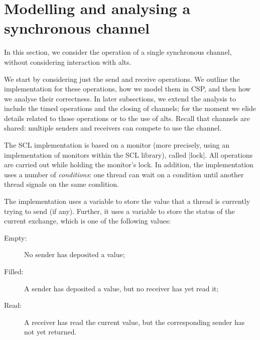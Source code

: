 \section{Modelling and analysing a  synchronous channel}
\label{sec:syncchan}

\inlineScala

In this section, we consider the operation of a single synchronous channel,
without considering interaction with alts.

We start by considering just the send and receive operations.  We outline the
implementation for these operations, how we model them in CSP, and then how we
analyse their correctness.  In later subsections, we extend the analysis to
include the timed operations and the closing of channels; for the moment we
elide details related to those operations or to the use of alts.  Recall that
channels are shared: multiple senders and receivers can compete to use the
channel.

The SCL implementation is based on a monitor (more precisely, using an
implementation of monitors within the SCL library), called |lock|.  All
operations are carried out while holding the monitor's lock.  In addition, the
implementation uses a number of \emph{conditions}: one thread can wait on a
condition until another thread signals on the same condition.

The implementation uses a variable  to store the value that a
thread is currently trying to send (if any).  Further, it uses a variable
 to store the status of the current exchange, which is one of
the following values:
%
\begin{description}
\item[{\scalastyle Empty}:] No sender has deposited a value;
\item[{\scalastyle Filled}:] A sender has deposited a value, but no receiver
  has yet read it;
\item[{\scalastyle Read}:] A receiver has read the current value, but the
  corresponding sender has not yet returned.
\end{description}
%


